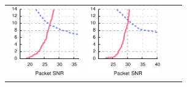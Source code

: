 \begin{figure}[p]
\begin{leftfullpage}
\begin{tabular}{cccc}
	\includegraphics[height=1.2in]{figures/delivery/goodbad/packet_snr_goodbad_14.pdf} &
	\includegraphics[height=1.2in]{figures/delivery/goodbad/packet_snr_goodbad_15.pdf} \\


\end{tabular}
\end{leftfullpage}
\end{figure}
